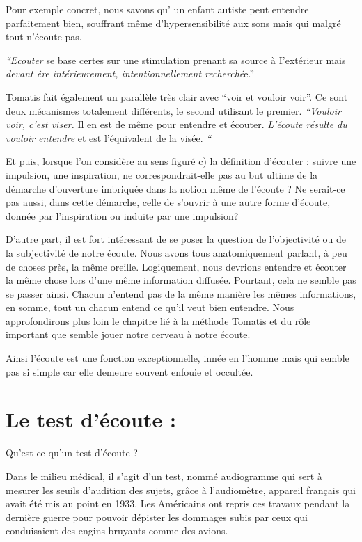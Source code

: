 Pour exemple concret, nous savons qu' un enfant autiste peut entendre
parfaitement bien, souffrant même d'hypersensibilité aux sons mais
qui malgré tout n'écoute pas.\emph{ }

\emph{``Ecouter} se base certes sur une stimulation prenant sa source
à I'extérieur mais \emph{devant êre intérieurement, intentionnellement
recherché}e.'' 

Tomatis fait également un parallèle très clair avec ``voir et vouloir
voir''. Ce sont deux mécanismes totalement différents, le second
utilisant le premier. \emph{``Vouloir voir, c'est viser. }Il en est
de même pour entendre et écouter.\emph{ L\textquoteright écoute résulte
du vouloir entendre }et est l\textquoteright équivalent de la visée.\emph{
``}

Et puis, lorsque l'on considère au sens figuré c) la définition d'écouter
: suivre une impulsion, une inspiration, ne correspondrait-elle pas
au but ultime de la démarche d'ouverture imbriquée dans la notion
même de l'écoute ? Ne serait-ce pas aussi, dans cette démarche, celle
de s'ouvrir à une autre forme d'écoute, donnée par l'inspiration ou
induite par une impulsion? 

D'autre part, il est fort intéressant de se poser la question de l'objectivité
ou de la subjectivité de notre écoute. Nous avons tous anatomiquement
parlant, à peu de choses près, la même oreille. Logiquement, nous
devrions entendre et écouter la même chose lors d'une même information
diffusée. Pourtant, cela ne semble pas se passer ainsi. Chacun n'entend
pas de la même manière les mêmes informations, en somme, tout un chacun
entend ce qu'il veut bien entendre. Nous approfondirons plus loin
le chapitre lié à la méthode Tomatis et du rôle important que semble
jouer notre cerveau à notre écoute. 

Ainsi l'écoute est une fonction exceptionnelle, innée en l'homme mais
qui semble pas si simple car elle demeure souvent enfouie et occultée.

\section{Le test d'écoute :}

Qu'est-ce qu'un test d'écoute ?

Dans le milieu médical, il s'agit d'un test, nommé audiogramme qui
sert à mesurer les seuils d'audition des sujets, grâce à l'audiomètre,
appareil français qui avait été mis au point en 1933. Les Américains
ont repris ces travaux pendant la dernière guerre pour pouvoir dépister
les dommages subis par ceux qui conduisaient des engins bruyants comme
des avions.

